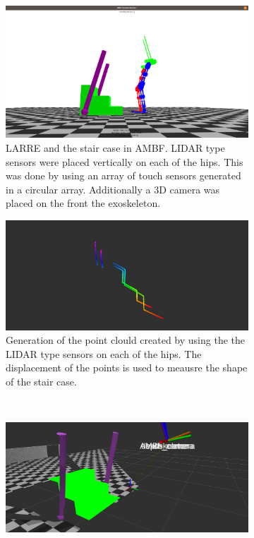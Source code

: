  \begin{figure}[h]
    \begin{subfigure}{.5\linewidth}
        \centering
        \includegraphics[scale=0.1]{images/sim/stair2.png}
        \caption{LARRE and the stair case in AMBF. LIDAR type sensors were placed vertically on each of the hips. This was done by using an array of touch sensors generated in a circular array. Additionally a 3D camera was placed on the front the exoskeleton. }
        \label{fig:exostair}
        \label{fig:sub1}
    \end{subfigure}%
    \begin{subfigure}{.5\linewidth}
       \centering
        \includegraphics[scale=0.15]{images/sim/point_cloud_stairs.png}
        \caption[Point Cloud of the Stairs]{ Generation of the point clould created by using the the LIDAR type sensors on each of the hips. The displacement of the points is used to meausre the shape of the stair case.}
        \label{fig:LIDAR}
        \end{subfigure}\\[1ex]
    \begin{subfigure}{\linewidth}
        \centering
        \includegraphics[scale=0.15]{images/sim/point_cloud_stairs2.png}

\end{subfigure}
\end{figure}
